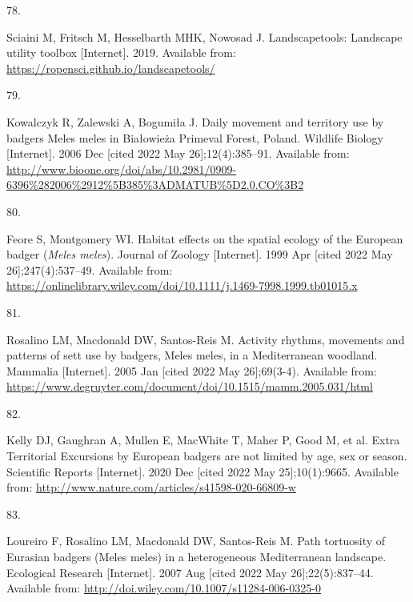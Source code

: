 \documentclass[10pt,a4paper]{article}
\newlength{\cslhangindent}
\newlength{\csllabelwidth}
\newlength{\cslentryspacingunit} %
\newenvironment{CSLReferences}[2] %
 {%
  \setlength{\parindent}{0pt}
  \ifodd #1
  \let\oldpar\par
  \def\par{\hangindent=\cslhangindent\oldpar}
  \fi
  \setlength{\parskip}{#2\cslentryspacingunit}
 }%
 {}
\newcommand{\CSLLeftMargin}[1]{\parbox[t]{\csllabelwidth}{#1}}
\newcommand{\CSLRightInline}[1]{\parbox[t]{\linewidth - \csllabelwidth}{#1}\break}
\begin{document}
\begin{CSLReferences}{0}{0}
\leavevmode{}%
\CSLLeftMargin{78. }
\CSLRightInline{Sciaini M, Fritsch M, Hesselbarth MHK, Nowosad J. Landscapetools: Landscape utility toolbox {[}Internet{]}. 2019. Available from: \url{https://ropensci.github.io/landscapetools/}}

\leavevmode{}%
\CSLLeftMargin{79. }
\CSLRightInline{Kowalczyk R, Zalewski A, Bogumiła J. Daily movement and territory use by badgers {Meles} meles in {Białowieża} {Primeval} {Forest}, {Poland}. Wildlife Biology {[}Internet{]}. 2006 Dec {[}cited 2022 May 26{]};12(4):385--91. Available from: \url{http://www.bioone.org/doi/abs/10.2981/0909-6396\%282006\%2912\%5B385\%3ADMATUB\%5D2.0.CO\%3B2}}

\leavevmode{}%
\CSLLeftMargin{80. }
\CSLRightInline{Feore S, Montgomery WI. Habitat effects on the spatial ecology of the {European} badger (\emph{{Meles} meles}). Journal of Zoology {[}Internet{]}. 1999 Apr {[}cited 2022 May 26{]};247(4):537--49. Available from: \url{https://onlinelibrary.wiley.com/doi/10.1111/j.1469-7998.1999.tb01015.x}}

\leavevmode{}%
\CSLLeftMargin{81. }
\CSLRightInline{Rosalino LM, Macdonald DW, Santos-Reis M. Activity rhythms, movements and patterns of sett use by badgers, {Meles} meles, in a {Mediterranean} woodland. Mammalia {[}Internet{]}. 2005 Jan {[}cited 2022 May 26{]};69(3-4). Available from: \url{https://www.degruyter.com/document/doi/10.1515/mamm.2005.031/html}}

\leavevmode{}%
\CSLLeftMargin{82. }
\CSLRightInline{Kelly DJ, Gaughran A, Mullen E, MacWhite T, Maher P, Good M, et al. Extra {Territorial} {Excursions} by {European} badgers are not limited by age, sex or season. Scientific Reports {[}Internet{]}. 2020 Dec {[}cited 2022 May 25{]};10(1):9665. Available from: \url{http://www.nature.com/articles/s41598-020-66809-w}}

\leavevmode{}%
\CSLLeftMargin{83. }
\CSLRightInline{Loureiro F, Rosalino LM, Macdonald DW, Santos-Reis M. Path tortuosity of {Eurasian} badgers ({Meles} meles) in a heterogeneous {Mediterranean} landscape. Ecological Research {[}Internet{]}. 2007 Aug {[}cited 2022 May 26{]};22(5):837--44. Available from: \url{http://doi.wiley.com/10.1007/s11284-006-0325-0}}


\end{CSLReferences}
\end{document}
